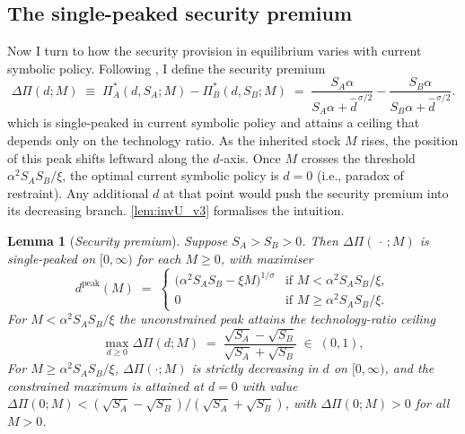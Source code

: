 \documentclass[11pt,twoside]{extarticle}
\newtheorem{lemma}{Lemma}
\begin{document}
\subsection{The single-peaked security premium}\label{subsec:invU_v3}

Now I turn to how the security provision in equilibrium varies with current symbolic policy. Following \citet{barutSymmetricMultiplePrize1998}, I define the security premium
\begin{equation}\label{eq:security_premium_v3}
    \Delta\Pi(d;M)\;\equiv\;\Pi_A^*(d,S_A;M)-\Pi_B^*(d,S_B;M)
    \;=\;\frac{S_A\alpha}{S_A\alpha+\hat d^{\,\sigma/2}}-\frac{S_B\alpha}{S_B\alpha+\hat d^{\,\sigma/2}}.
\end{equation}
which is single-peaked in current symbolic policy and attains a ceiling that depends only on the technology ratio. As the inherited stock $M$ rises, the position of this peak shifts leftward along the $d$-axis. Once $M$ crosses the threshold $\alpha^2 S_A S_B/\xi$, the optimal current symbolic policy is $d=0$ (i.e., paradox of restraint). Any additional $d$ at that point would push the security premium into its decreasing branch. \autoref{lem:invU_v3} formalises the intuition.

\begin{lemma}[\emph{Security premium}]\label{lem:invU_v3}
\emph{}
Suppose $S_A>S_B>0$. Then $\Delta\Pi(\,\cdot\,;M)$ is single-peaked on $[0,\infty)$ for each $M\ge 0$, with maximiser
\begin{equation}\label{eq:dpeak_v3}
    d^{\mathrm{peak}}(M)\;=\;\begin{cases}
        \big(\alpha^2 S_A S_B-\xi M\big)^{1/\sigma} & \text{if }M<\alpha^2 S_A S_B/\xi,\\[2pt]
        0 & \text{if }M\ge\alpha^2 S_A S_B/\xi.
    \end{cases}
\end{equation}
For $M<\alpha^2 S_A S_B/\xi$ the unconstrained peak attains the technology-ratio ceiling
\begin{equation}\label{eq:DPi_peak_v3}
    \max_{d\ge 0}\Delta\Pi(d;M)\;=\;\frac{\sqrt{S_A}-\sqrt{S_B}}{\sqrt{S_A}+\sqrt{S_B}}\;\in\;(0,1),
\end{equation}
For $M\ge\alpha^2 S_A S_B/\xi$, $\Delta\Pi(\cdot;M)$ is strictly decreasing in $d$ on $[0,\infty)$, and the constrained maximum is attained at $d=0$ with value $\Delta\Pi(0;M)<(\sqrt{S_A}-\sqrt{S_B})/(\sqrt{S_A}+\sqrt{S_B})$, with $\Delta\Pi(0;M)>0$ for all $M>0$.
\end{lemma}
\end{document}
